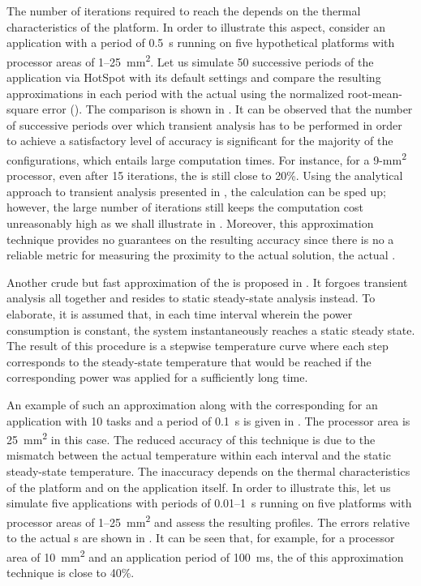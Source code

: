The number of iterations required to reach the  depends on the thermal
characteristics of the platform. In order to illustrate this aspect, consider an
application with a period of 0.5~s running on five hypothetical platforms with
processor areas of 1--25~mm\textsuperscript{2}. Let us simulate 50 successive
periods of the application via HotSpot with its default settings and compare the
resulting approximations in each period with the actual  using the
normalized root-mean-square error (). The comparison is shown in
. It can be observed that the number of
successive periods over which transient analysis has to be performed in order to
achieve a satisfactory level of accuracy is significant for the majority of the
configurations, which entails large computation times. For instance, for a
9-mm\textsuperscript{2} processor, even after 15 iterations, the  is
still close to 20\%. Using the analytical approach to transient analysis
presented in , the calculation can be sped up; however,
the large number of iterations still keeps the computation cost unreasonably
high as we shall illustrate in . Moreover,
this approximation technique provides no guarantees on the resulting accuracy
since there is no a reliable metric for measuring the proximity to the actual
solution, the actual .

Another crude but fast approximation of the  is proposed in
\cite{huang2009}. It forgoes transient analysis all together and resides to
static steady-state analysis instead. To elaborate, it is assumed that, in each
time interval wherein the power consumption is constant, the system
instantaneously reaches a static steady state. The result of this procedure is a
stepwise temperature curve where each step corresponds to the steady-state
temperature that would be reached if the corresponding power was applied for a
sufficiently long time.

An example of such an approximation along with the corresponding  for
an application with 10 tasks and a period of 0.1~s is given in
. The processor area is
25~mm\textsuperscript{2} in this case. The reduced accuracy of this technique is
due to the mismatch between the actual temperature within each interval and the
static steady-state temperature. The inaccuracy depends on the thermal
characteristics of the platform and on the application itself. In order to
illustrate this, let us simulate five applications with periods of 0.01--1~s
running on five platforms with processor areas of 1--25~mm\textsuperscript{2}
and assess the resulting profiles. The errors relative to the actual s
are shown in . It can be seen that, for example,
for a processor area of 10~mm\textsuperscript{2} and an application period of
100~ms, the  of this approximation technique is close to 40\%.

